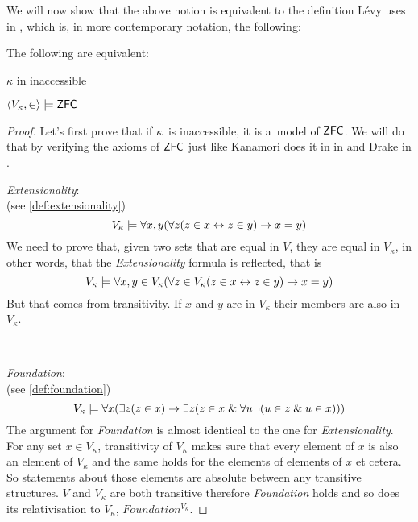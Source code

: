 We will now show that the above notion is equivalent to the definition Lévy uses in \cite{Levy60a}, which is, in more contemporary notation, the following:
\begin{theorem}\label{theorem:inaccessible_models_zfc}
The following are equivalent:
\bce
\item $\kappa$ in inaccessible
\item $\langle V_\kappa, \in \rangle \models \sf{ZFC}$
\ece
\end{theorem}

\begin{proof}
Let's first prove that if $\kappa$ is inaccessible, it is a~model of $\sf{ZFC}$. We will do that by verifying the axioms of $\sf{ZFC}$ just like Kanamori does it in in \cite[1.2]{KanamoriBook} and Drake in \cite[Chapter 4]{DrakeBook}. 
\bce[(i)]
\item \emph{Extensionality}:\\
(see \ref{def:extensionality})
\begin{equation}
V_\kappa \models \forall x, y(\forall z (z \in x \leftrightarrow z \in y) \rightarrow x = y) 
\end{equation}
We need to prove that, given two sets that are equal in $V$, they are equal in $V_\kappa$, in other words, that the \emph{Extensionality} formula is reflected, that is
\begin{equation}
V_\kappa \models \forall x, y \in V_\kappa (\forall z \in V_\kappa (z \in x \leftrightarrow z \in y) \rightarrow x = y) 
\end{equation}
But that comes from transitivity. If $x$ and $y$ are in $V_\kappa$ their members are also in $V_\kappa$.

\

\item \emph{Foundation}:\\
(see \ref{def:foundation})
\begin{equation}
V_\kappa \models \forall x (\exists z (z \in x) \rightarrow \exists z (z \in x \mathrel{\&} \forall u \neg (u \in z \mathrel{\&} u \in x)))
\end{equation}
The argument for \emph{Foundation} is almost identical to the one for \emph{Extensionality}. For any set $x \in V_\kappa$, transitivity of $V_\kappa$ makes sure that every element of $x$ is also an element of $V_\kappa$ and the same holds for the elements of elements of $x$ et cetera. So statements about those elements are absolute between any transitive structures. $V$ and $V_\kappa$ are both transitive therefore \emph{Foundation} holds and so does its relativisation to $V_\kappa$, $Foundation^{V_\kappa}$.


\end{proof}
